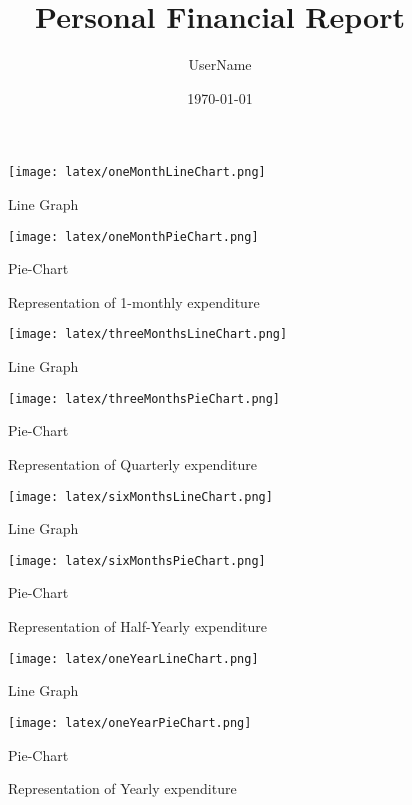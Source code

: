 \documentclass{article}
\begin{document}
\title{Personal Financial Report}
\author{UserName}
\date{\today}
\maketitle


\begin{figure}[htbp]
    \centering
    \begin{minipage}{0.45\textwidth}
        \centering
        \texttt{[image: latex/oneMonthLineChart.png]}
        \caption{Line Graph}
    \end{minipage}\hfill
    \begin{minipage}{0.45\textwidth}
        \centering
        \texttt{[image: latex/oneMonthPieChart.png]}
        \caption{Pie-Chart}
    \end{minipage}
    \caption{Representation of 1-monthly expenditure}
\end{figure}


\begin{figure}[htbp]
    \centering
    \begin{minipage}{0.45\textwidth}
        \centering
        \texttt{[image: latex/threeMonthsLineChart.png]}
        \caption{Line Graph}
    \end{minipage}\hfill
    \begin{minipage}{0.45\textwidth}
        \centering
        \texttt{[image: latex/threeMonthsPieChart.png]}
        \caption{Pie-Chart}
    \end{minipage}
    \caption{Representation of Quarterly expenditure}
\end{figure}


\begin{figure}[htbp]
    \centering
    \begin{minipage}{0.45\textwidth}
        \centering
        \texttt{[image: latex/sixMonthsLineChart.png]}
        \caption{Line Graph}
    \end{minipage}\hfill
    \begin{minipage}{0.45\textwidth}
        \centering
        \texttt{[image: latex/sixMonthsPieChart.png]}
        \caption{Pie-Chart}
    \end{minipage}
    \caption{Representation of Half-Yearly expenditure}
\end{figure}


\begin{figure}[htbp]
    \centering
    \begin{minipage}{0.45\textwidth}
        \centering
        \texttt{[image: latex/oneYearLineChart.png]}
        \caption{Line Graph}
    \end{minipage}\hfill
    \begin{minipage}{0.45\textwidth}
        \centering
        \texttt{[image: latex/oneYearPieChart.png]}
        \caption{Pie-Chart}
    \end{minipage}
    \caption{Representation of Yearly expenditure}
\end{figure}
\end{document}
